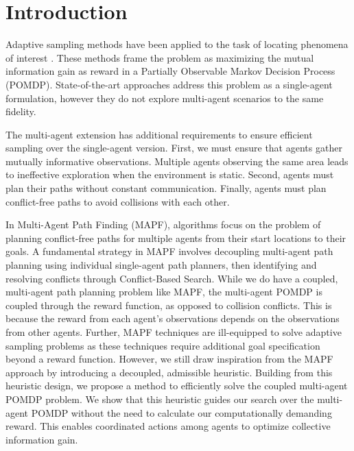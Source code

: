 \documentclass[letterpaper, 10 pt, conference]{IEEEConference}
\begin{document}
\begin{abstract}
\end{abstract}

\section{Introduction}

Adaptive sampling methods have been applied to the task of locating phenomena of interest \cite{ayton2017}. These methods frame the problem as maximizing the mutual information gain as reward in a Partially Observable Markov Decision Process (POMDP). State-of-the-art approaches address this problem as a single-agent formulation, however they do not explore multi-agent scenarios to the same fidelity. 

The multi-agent extension has additional requirements to ensure efficient sampling over the single-agent version. First, we must ensure that agents gather mutually informative observations. Multiple agents observing the same area leads to ineffective exploration when the environment is static. Second, agents must plan their paths without constant communication. Finally, agents must plan conflict-free paths to avoid collisions with each other.

In Multi-Agent Path Finding (MAPF), algorithms focus on the problem of planning conflict-free paths for multiple agents from their start locations to their goals. A fundamental strategy in MAPF involves decoupling multi-agent path planning using individual single-agent path planners, then identifying and resolving conflicts through Conflict-Based Search. While we do have a coupled, multi-agent path planning problem like MAPF, the multi-agent POMDP is coupled through the reward function, as opposed to collision conflicts. This is because the reward from each agent's observations depends on the observations from other agents. Further, MAPF techniques are ill-equipped to solve adaptive sampling problems as these techniques require additional goal specification beyond a reward function. However, we still draw inspiration from the MAPF approach by introducing a decoupled, admissible heuristic. Building from this heuristic design, we propose a method to efficiently solve the coupled multi-agent POMDP problem. We show that this heuristic guides our search over the multi-agent POMDP without the need to calculate our computationally demanding reward. This enables coordinated actions among agents to optimize collective information gain. 
\end{document}
